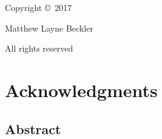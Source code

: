 

\begin{titlepage}
\begin{center}
\vspace*{\fill}
Copyright \copyright~2017

Matthew Layne Beckler

All rights reserved
\vspace*{\fill}
\end{center}
\end{titlepage}


\chapter*{Acknowledgments}


\newpage

\section*{Abstract}


\newpage

\tableofcontents
\listoftables
\listoffigures
\listofalgorithms
\clearpage

\renewcommand{\headrulewidth}{0pt}
\fancyhf{}
\mbox{}
\newpage
\pagestyle{fancy}
\renewcommand{\headrulewidth}{0.4pt}
\fancyhead[RE,LO]{\bf \thepage}
\fancyhead[RO]{\bf \leftmark}
\fancyhead[LE]{\bf \rightmark}
\fancyfoot[C]{}

